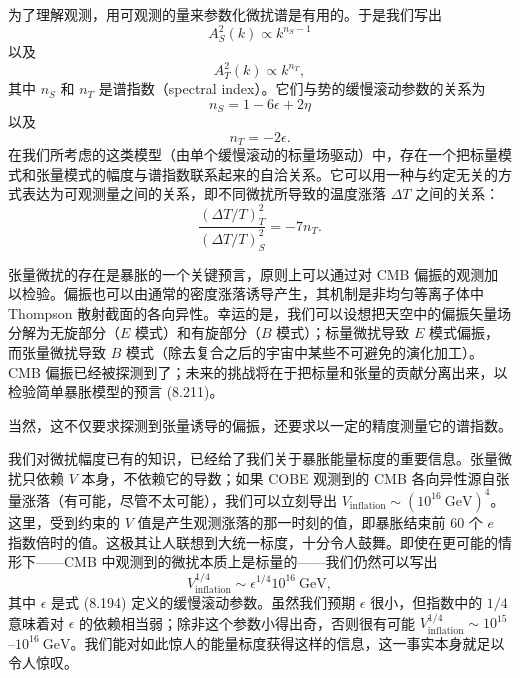 为了理解观测，用可观测的量来参数化微扰谱是有用的。于是我们写出
\begin{equation*}
A_{S}^{2}(k) \propto k^{n_{S}-1}
\tag{8.207}
\end{equation*}
以及
\begin{equation*}
A_{T}^{2}(k) \propto k^{n_{T}},
\tag{8.208}
\end{equation*}
其中 $n_{S}$ 和 $n_{T}$ 是谱指数（spectral index）。它们与势的缓慢滚动参数的关系为
\begin{equation*}
n_{S} = 1 - 6\epsilon + 2\eta
\tag{8.209}
\end{equation*}
以及
\begin{equation*}
n_{T} = -2\epsilon.
\tag{8.210}
\end{equation*}
在我们所考虑的这类模型（由单个缓慢滚动的标量场驱动）中，存在一个把标量模式和张量模式的幅度与谱指数联系起来的自洽关系。它可以用一种与约定无关的方式表达为可观测量之间的关系，即不同微扰所导致的温度涨落 $\Delta T$ 之间的关系：
\begin{equation*}
\frac{(\Delta T/T)_{T}^{2}}{(\Delta T/T)_{S}^{2}} = -7n_{T}.
\tag{8.211}
\end{equation*}

张量微扰的存在是暴胀的一个关键预言，原则上可以通过对 CMB 偏振的观测加以检验。偏振也可以由通常的密度涨落诱导产生，其机制是非均匀等离子体中 Thompson 散射截面的各向异性。幸运的是，我们可以设想把天空中的偏振矢量场分解为无旋部分（$E$ 模式）和有旋部分（$B$ 模式）；标量微扰导致 $E$ 模式偏振，而张量微扰导致 $B$ 模式（除去复合之后的宇宙中某些不可避免的演化加工）。CMB 偏振已经被探测到了；未来的挑战将在于把标量和张量的贡献分离出来，以检验简单暴胀模型的预言 (8.211)。

当然，这不仅要求探测到张量诱导的偏振，还要求以一定的精度测量它的谱指数。

我们对微扰幅度已有的知识，已经给了我们关于暴胀能量标度的重要信息。张量微扰只依赖 $V$ 本身，不依赖它的导数；如果 COBE 观测到的 CMB 各向异性源自张量涨落（有可能，尽管不太可能），我们可以立刻导出 $V_{\mathrm{inflation}}\sim(10^{16}~\mathrm{GeV})^{4}$。这里，受到约束的 $V$ 值是产生观测涨落的那一时刻的值，即暴胀结束前 60 个 $e$ 指数倍时的值。这极其让人联想到大统一标度，十分令人鼓舞。即使在更可能的情形下——CMB 中观测到的微扰本质上是标量的——我们仍然可以写出
\begin{equation*}
V_{\mathrm{inflation}}^{1/4} \sim \epsilon^{1/4}10^{16}~\mathrm{GeV},
\tag{8.212}
\end{equation*}
其中 $\epsilon$ 是式 (8.194) 定义的缓慢滚动参数。虽然我们预期 $\epsilon$ 很小，但指数中的 $1/4$ 意味着对 $\epsilon$ 的依赖相当弱；除非这个参数小得出奇，否则很有可能 $V_{\mathrm{inflation}}^{1/4}\sim 10^{15}$--$10^{16}~\mathrm{GeV}$。我们能对如此惊人的能量标度获得这样的信息，这一事实本身就足以令人惊叹。

